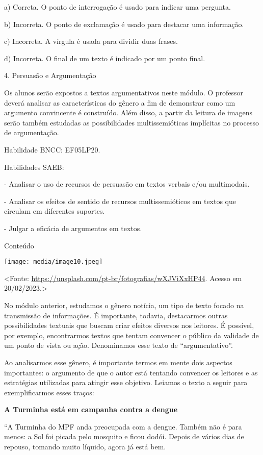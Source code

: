 a) Correta. O ponto de interrogação é usado para indicar uma pergunta.

b) Incorreta. O ponto de exclamação é usado para destacar uma
informação.

c) Incorreta. A vírgula é usada para dividir duas frases.

d) Incorreta. O final de um texto é indicado por um ponto final.

4. Persuasão e Argumentação

Os alunos serão expostos a textos argumentativos neste módulo. O
professor deverá analisar as características do gênero a fim de
demonstrar como um argumento convincente é construído. Além disso, a
partir da leitura de imagens serão também estudadas as possibilidades
multissemióticas implícitas no processo de argumentação.

Habilidade BNCC: EF05LP20.

Habilidades SAEB:

- Analisar o uso de recursos de persuasão em textos verbais e/ou
multimodais.

- Analisar os efeitos de sentido de recursos multissemióticos em textos
que circulam em diferentes suportes.

- Julgar a eficácia de argumentos em textos.

Conteúdo

\texttt{[image: media/image10.jpeg]}

\textless{}Fonte:
\url{https://unsplash.com/pt-br/fotografias/wXJViXxHP44}. Acesso em
20/02/2023.\textgreater{}

No módulo anterior, estudamos o gênero notícia, um tipo de texto focado
na transmissão de informações. É importante, todavia, destacarmos outras
possibilidades textuais que buscam criar efeitos diversos nos leitores.
É possível, por exemplo, encontrarmos textos que tentam convencer o
público da validade de um ponto de vista ou ação. Denominamos esse texto
de ``argumentativo''.

Ao analisarmos esse gênero, é importante termos em mente dois aspectos
importantes: o argumento de que o autor está tentando convencer os
leitores e as estratégias utilizadas para atingir esse objetivo. Leiamos
o texto a seguir para exemplificarmos esses traços:

\textbf{A Turminha está em campanha contra a dengue}

``A Turminha do MPF anda preocupada com a dengue. Também não é para
menos: a Sol foi picada pelo mosquito e ficou dodói. Depois de vários
dias de repouso, tomando muito líquido, agora já está bem.

